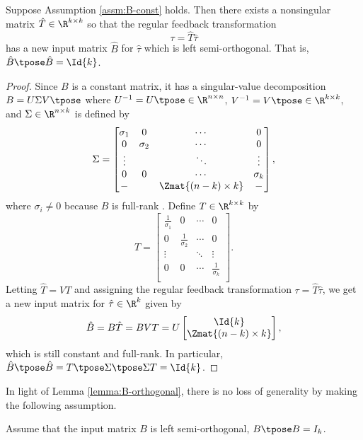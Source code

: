 \begin{lemma}\label{lemma:B-orthogonal}
    Suppose Assumption \ref{assm:B-const} holds. Then
    there exists a nonsingular matrix \(\hat{T} \in \R^{k \times k}\) 
    so that the regular feedback transformation 
    \[
        \tau = \hat{T} \hat{\tau}
    \] 
    has a new input matrix \(\hat{B}\) for \(\hat{\tau}\) which is left
    semi-orthogonal.  
    That is, \(\hat{B}\tpose \hat{B} = \Id{k}\).
\end{lemma}
\begin{proof}
Since \(B\) is a constant matrix, 
it has a singular-value decomposition 
\(B = U \Sigma V\tpose\) where \(U^{-1} = U\tpose \in \R^{n \times n}\), 
\(V^{-1} = V\tpose \in \R^{k \times k}\), and \(\Sigma \in \R^{n \times k}\) is
defined by
\[
    \Sigma = \begin{bmatrix}
        \sigma_1 & 0 & \cdots & 0 \\
        0 & \sigma_2 & \cdots & 0 \\
        \vdots & & \ddots & \vdots \\
        0 & 0 & \cdots & \sigma_k \\
        - &   & \Zmat{(n-k)\times k} & -  \\
    \end{bmatrix}
    ,
\]
where \(\sigma_i \neq 0\) because \(B\) is full-rank \cite{calculating_svd}.
Define \(T \in \R^{k \times k}\) by
\[
    T = \begin{bmatrix}
        \frac{1}{\sigma_1} & 0 & \cdots & 0 \\
        0 & \frac{1}{\sigma_2} & \cdots & 0 \\
    \vdots & & \ddots & \vdots \\
    0 & 0 & \cdots & \frac{1}{\sigma_k} \\
    \end{bmatrix}
    .
\]
Letting \(\hat{T} = V T\) and assigning the regular feedback
transformation \(\tau = \hat{T} \hat{\tau}\), 
we get a new input matrix for \(\hat{\tau} \in \R^k\) given by 
\[
    \hat{B} = B \hat{T} = B V T = 
    U \begin{bmatrix}
        \Id{k} \\ \Zmat{(n-k)\times k}
    \end{bmatrix}
    ,
\]
which is still constant and full-rank. 
In particular, 
\(\hat{B}\tpose \hat{B} = T\tpose \Sigma\tpose \Sigma T = \Id{k}\).
\end{proof}

In light of Lemma \ref{lemma:B-orthogonal}, there is no loss of generality
by making the following assumption.
\begin{assm}\label{assm:B-orthogonal}
    Assume that the input matrix \(B\) is
    left semi-orthogonal, \ie \(B\tpose B = I_k\). 
\end{assm}

